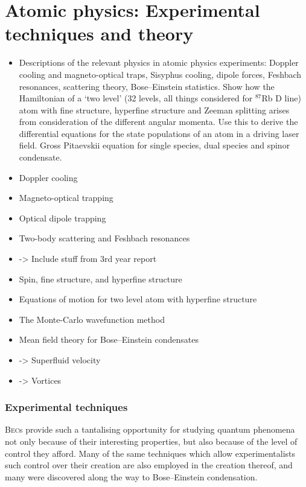 \chapter{Atomic physics: Experimental techniques and theory}

\begin{itemize}
\item Descriptions of the relevant physics in atomic physics experiments: Doppler cooling and magneto-optical traps, Sisyphus cooling, dipole forces, Feshbach resonances, scattering theory, Bose–Einstein statistics. Show how the Hamiltonian of a `two level' (32 levels, all things considered for $^{87}$Rb D line) atom with fine structure, hyperfine structure and Zeeman splitting arises from consideration of the different angular momenta. Use this to derive the differential equations for the state populations of an atom in a driving laser field. Gross Pitaevskii equation for single species, dual species and spinor condensate.

\item{Doppler cooling}
\item{Magneto-optical trapping}
\item{Optical dipole trapping}
\item{Two-body scattering and Feshbach resonances}
\item{ -> Include stuff from 3rd year report}
\item{Spin, fine structure, and hyperfine structure}
\item{Equations of motion for two level atom with hyperfine structure}
\item{The Monte-Carlo wavefunction method}
\item{Mean field theory for Bose–Einstein condensates}
\item{ -> Superfluid velocity}
\item{ -> Vortices}

\end{itemize}
\subsection{Experimental techniques}
\textsc{Bec}s provide such a tantalising opportunity for studying quantum phenomena not only because of their interesting properties, but also because of the level of control they afford. Many of the same techniques which allow experimentalists such control over their creation are also employed in the creation thereof, and many were discovered along the way to Bose--Einstein condensation.

